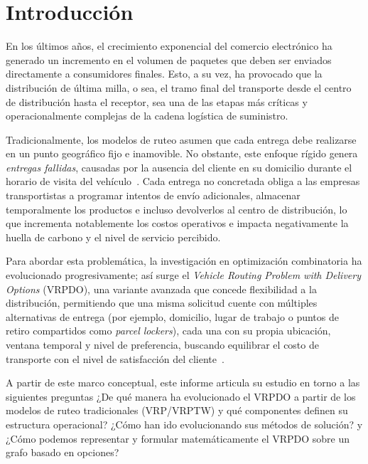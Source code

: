 \documentclass[letter, 10pt]{article}
\begin{document}
\section{Introducci\'on}

En los últimos años, el crecimiento exponencial del comercio electrónico ha generado un incremento en el volumen de paquetes que deben ser enviados directamente a consumidores finales. Esto, a su vez, ha provocado que la distribución de última milla, o sea, el tramo final del transporte desde el centro de distribución hasta el receptor, sea una de las etapas más críticas y operacionalmente complejas de la cadena logística de suministro.

\vspace{2mm}

Tradicionalmente, los modelos de ruteo asumen que cada entrega debe realizarse en un punto geográfico fijo e inamovible. No obstante, este enfoque rígido genera \emph{entregas fallidas}, causadas por la ausencia del cliente en su domicilio durante el horario de visita del vehículo~\cite{Gomez26VRPDO}. Cada entrega no concretada obliga a las empresas transportistas a programar intentos de envío adicionales, almacenar temporalmente los productos e incluso devolverlos al centro de distribución, lo que incrementa notablemente los costos operativos e impacta negativamente la huella de carbono y el nivel de servicio percibido.

\vspace{2mm}

Para abordar esta problemática, la investigación en optimización combinatoria ha evolucionado progresivamente; así surge el \emph{Vehicle Routing Problem with Delivery Options} (VRPDO), una variante avanzada que concede flexibilidad a la distribución, permitiendo que una misma solicitud cuente con múltiples alternativas de entrega (por ejemplo, domicilio, lugar de trabajo o puntos de retiro compartidos como \emph{parcel lockers}), cada una con su propia ubicación, ventana temporal y nivel de preferencia, buscando equilibrar el costo de transporte con el nivel de satisfacción del cliente~\cite{Tilk21LastMile}.

\vspace{2mm}

A partir de este marco conceptual, este informe articula su estudio en torno a las siguientes preguntas ¿De qué manera ha evolucionado el VRPDO a partir de los modelos de ruteo tradicionales (VRP/VRPTW) y qué componentes definen su estructura operacional? ¿Cómo han ido evolucionando sus métodos de solución? y ¿Cómo podemos representar y formular matemáticamente el VRPDO sobre un grafo basado en opciones?
\end{document}

